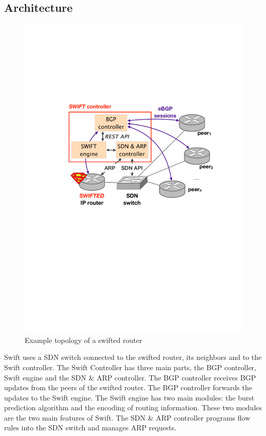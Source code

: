 \subsection{\label{chapter2:Swift:Architecture_SWift}Architecture}

\begin{figure}[h]
\center
\includegraphics[scale = 0.5]{Figures/bckgrnd_swift_architecture.pdf}
\caption{Example topology of a swifted router}
\end{figure}

Swift uses a SDN switch connected to the swifted router, its neighbors and to the Swift controller. The Swift Controller has three main parts, the  BGP controller, Swift engine and the SDN \& ARP controller. The BGP controller receives BGP updates from the peers of the swifted router. The BGP controller forwards the updates to the Swift engine. The Swift engine has two main modules: the burst prediction algorithm and the encoding of routing information. These two modules are the two main features of Swift. The SDN \& ARP controller programs flow rules into the SDN switch and manages ARP requests. 


